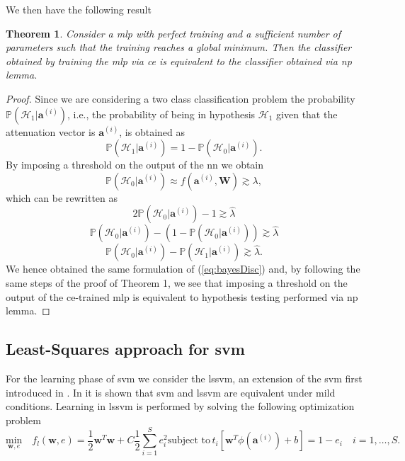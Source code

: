 \documentclass[draftcls,onecolumn,12pt]{IEEEtran}
\newtheorem{theorem}{Theorem}
\begin{document}
We then have the following result
\begin{theorem}
\label{th:nn_np2}
Consider a \ac{mlp} with perfect training and a sufficient number of parameters such that the training reaches a global minimum. Then the classifier obtained by training the \ac{mlp} via \ac{ce} is equivalent to the classifier obtained via \ac{np} lemma.
\end{theorem}
\begin{proof}
Since we are considering a two class classification problem the probability $\mathbb{P}(\mathcal{H}_1|\bm{a}^{(i)})$, i.e., the probability of being in hypothesis $\mathcal{H}_1$ given that the attenuation vector is $\bm{a}^{(i)}$, is obtained as
\begin{equation}
    \mathbb{P}(\mathcal{H}_1|\bm{a}^{(i)}) = 1- \mathbb{P}(\mathcal{H}_0|\bm{a}^{(i)}).
\end{equation}
By imposing a threshold on the output of the \ac{nn} we obtain
\begin{equation}
    \mathbb{P}(\mathcal{H}_0|\bm{a}^{(i)}) \approx  f(\bm{a}^{(i)},\bm{W}) \gtrsim \lambda,
\end{equation}
which can be rewritten as
\begin{equation}
    2\mathbb{P}(\mathcal{H}_0|\bm{a}^{(i)})-1 \gtrsim \hat{\lambda}
\end{equation}
\begin{equation}
    \mathbb{P}(\mathcal{H}_0|\bm{a}^{(i)})-(1-\mathbb{P}(\mathcal{H}_0|\bm{a}^{(i)})) \gtrsim \hat{\lambda}
\end{equation}
\begin{equation}
    \mathbb{P}(\mathcal{H}_0|\bm{a}^{(i)})-\mathbb{P}(\mathcal{H}_1|\bm{a}^{(i)}) \gtrsim \hat{\lambda}.
\end{equation}
We hence obtained the same formulation of (\ref{eq:bayesDisc}) and, by following the same steps of the proof of Theorem 1, we see that imposing a threshold on the output of the \ac{ce}-trained \ac{mlp} is equivalent to hypothesis testing performed via \ac{np} lemma.
\end{proof}


\subsection{Least-Squares approach for \ac{svm}}
For the learning phase of \ac{svm} we consider the \ac{lssvm}, an extension of the \ac{svm} first introduced in \cite{Suykens1999}. In \cite{Yevs} it is shown that  \ac{svm} and \ac{lssvm} are equivalent under mild conditions. Learning in \ac{lssvm} is performed by solving the following optimization problem
\begin{subequations}
	\label{eq:lssvm}
	\begin{equation}
	\label{eq:lssvmOrig}
	\underset{\mathbf{w},e}{\text{min}} \quad f_l(\mathbf{w},e) = \frac{1}{2} \mathbf{w}^T \mathbf{w} + C \frac{1}{2} \sum_{i=1}^S e_i ^2 
	\end{equation}
	\begin{equation}
	\label{eq:stpart}
	\text{subject to}\,  t_i[\mathbf{w}^T \phi (\mathbf{a}^{(i)}) + b] = 1- e_i\quad i = 1 ,\dots,S.
	\end{equation}
\end{subequations}
\end{document}
